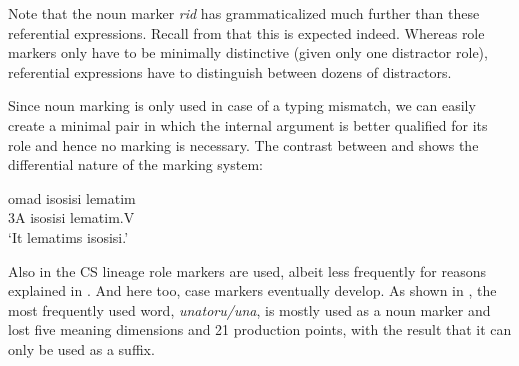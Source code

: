 \documentclass[output=paper]{LSP/langsci}
\begin{document}
Note that the noun marker \textit{rid} has grammaticalized much further than these referential expressions. Recall from  that this is expected indeed. Whereas role markers only have to be minimally distinctive (given only one distractor role), referential expressions have to distinguish between dozens of distractors. 

Since noun marking is only used in case of a typing mismatch, we can easily create a minimal pair in which the internal argument is better qualified for its role and hence no marking is necessary. The contrast between  and  shows the differential nature of the marking system:

\ea\label{17-le-ex:10}
\gll omad isosisi lematim\\
3A isosisi lematim.V\\
\glt `It lematims isosisi.'
\z

Also in the CS lineage role markers are used, albeit less frequently for reasons explained in . And here too, case markers eventually develop. As shown in , the most frequently used word, \textit{unatoru/una}, is mostly used as a noun marker and lost five meaning dimensions and 21 production points, with the result that it can only be used as a suffix.

\begin{table}
\caption{Representations of three most frequent words of the CS lineage\label{17-le-tab:9-CS}.}
\end{table}
\end{document}
